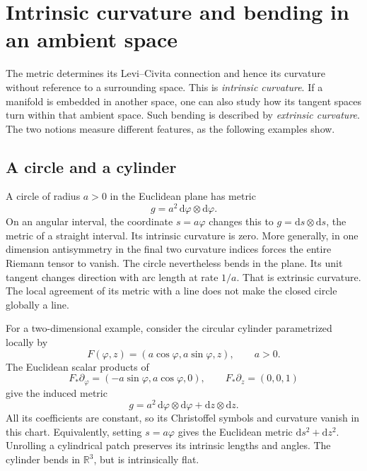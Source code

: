 \documentclass[11pt,a4paper]{article}
\numberwithin{equation}{section}
\newcommand{\R}{\mathbb R}
\newcommand{\dd}{\mathrm d}
\newcommand{\slideref}[1]{\par\nobreak\smallskip\nobreak{\footnotesize\color{ink!60}\textsc{Source slide #1}}\par\nobreak\smallskip\nobreak}
\begin{document}
\section{Intrinsic curvature and bending in an ambient space}
\label{gr2:intrinsic-curvature}
\slideref{14}

The metric determines its Levi--Civita connection and hence its
curvature without reference to a surrounding space. This is
\emph{intrinsic curvature}. If a manifold is embedded in another
space, one can also study how its tangent spaces turn within that
ambient space. Such bending is described by \emph{extrinsic
curvature}. The two notions measure different features, as the
following examples show.

\subsection{A circle and a cylinder}

A circle of radius \(a>0\) in the Euclidean plane has metric
\[
 g=a^2\,\dd\varphi\otimes\dd\varphi.
\]
On an angular interval, the coordinate \(s=a\varphi\) changes this
to \(g=\dd s\otimes\dd s\), the metric of a straight interval.
Its intrinsic curvature is zero. More generally, in one dimension
antisymmetry in the final two curvature indices forces the entire
Riemann tensor to vanish. The circle nevertheless bends in the
plane. Its unit tangent changes direction with arc length at rate
\(1/a\). That is extrinsic curvature. The local agreement of its
metric with a line does not make the closed circle globally a line.

For a two-dimensional example, consider the circular cylinder
parametrized locally by
\[
 F(\varphi,z)=(a\cos\varphi,a\sin\varphi,z),
 \qquad a>0.
\]
The Euclidean scalar products of
\[
 F_*\partial_\varphi=(-a\sin\varphi,a\cos\varphi,0),
 \qquad F_*\partial_z=(0,0,1)
\]
give the induced metric
\[
 g=a^2\,\dd\varphi\otimes\dd\varphi
   +\dd z\otimes\dd z.
\]
All its coefficients are constant, so its Christoffel symbols and
curvature vanish in this chart. Equivalently, setting \(s=a\varphi\)
gives the Euclidean metric \(\dd s^2+\dd z^2\). Unrolling a
cylindrical patch preserves its intrinsic lengths and angles.
The cylinder bends in \(\R^3\), but is intrinsically flat.
\end{document}
